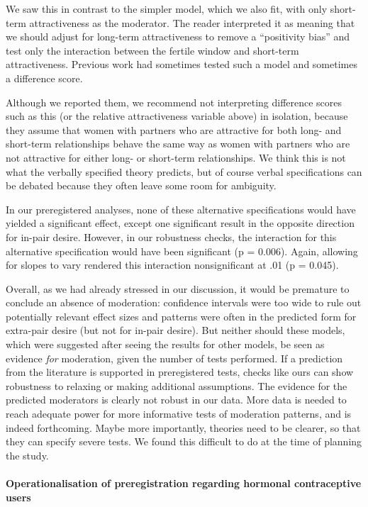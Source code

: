 \documentclass[]{article}
\let\oldparagraph\paragraph
\renewcommand{\paragraph}[1]{\oldparagraph{#1}\mbox{}}
\begin{document}
We saw this in contrast to the simpler model, which we also fit, with
only short-term attractiveness as the moderator. The reader interpreted
it as meaning that we should adjust for long-term attractiveness to
remove a ``positivity bias'' and test only the interaction between the
fertile window and short-term attractiveness. Previous work had
sometimes tested such a model and sometimes a difference score.

Although we reported them, we recommend not interpreting difference
scores such as this (or the relative attractiveness variable above) in
isolation, because they assume that women with partners who are
attractive for both long- and short-term relationships behave the same
way as women with partners who are not attractive for either long- or
short-term relationships. We think this is not what the verbally
specified theory predicts, but of course verbal specifications can be
debated because they often leave some room for ambiguity.

In our preregistered analyses, none of these alternative specifications
would have yielded a significant effect, except one significant result
in the opposite direction for in-pair desire. However, in our robustness
checks, the interaction for this alternative specification would have
been significant (p = 0.006). Again, allowing for slopes to vary
rendered this interaction nonsignificant at .01 (p = 0.045).

Overall, as we had already stressed in our discussion, it would be
premature to conclude an absence of moderation: confidence intervals
were too wide to rule out potentially relevant effect sizes and patterns
were often in the predicted form for extra-pair desire (but not for
in-pair desire). But neither should these models, which were suggested
after seeing the results for other models, be seen as evidence
\emph{for} moderation, given the number of tests performed. If a
prediction from the literature is supported in preregistered tests,
checks like ours can show robustness to relaxing or making additional
assumptions. The evidence for the predicted moderators is clearly not
robust in our data. More data is needed to reach adequate power for more
informative tests of moderation patterns, and is indeed forthcoming.
Maybe more importantly, theories need to be clearer, so that they can
specify severe tests. We found this difficult to do at the time of
planning the study.

\hypertarget{operationalisation-of-preregistration-regarding-hormonal-contraceptive-users}{%
\paragraph{Operationalisation of preregistration regarding hormonal
contraceptive
users}\label{operationalisation-of-preregistration-regarding-hormonal-contraceptive-users}}
\end{document}
